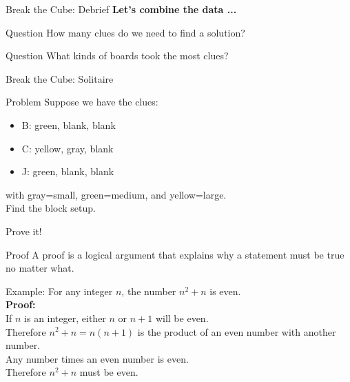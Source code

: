 \documentclass{beamer}
\begin{document}
\begin{frame}{Break the Cube: Debrief}
\pause
\textbf{Let's combine the data ...}
\pause
  \begin{block}{Question}
    How many clues do we need to find a solution?
  \end{block}
  \begin{block}{Question}
    What kinds of boards took the most clues?
  \end{block}
\end{frame}

\begin{frame}{Break the Cube: Solitaire}
  \begin{block}{Problem}
    Suppose we have the clues:
    \begin{itemize}
      \item B: green, blank, blank
      \item C: yellow, gray, blank
      \item J: green, blank, blank
    \end{itemize}
    with gray=small, green=medium, and yellow=large.\\
    Find the block setup.
  \end{block}
\end{frame}

\begin{frame}{Prove it!}
    \pause
  \begin{block}{Proof}
    A proof is a logical argument that explains why a statement must be true no matter what.
  \end{block}
    \pause
  \begin{block}{Example:}
    For any integer $n$, the number $n^2+n$ is even.\\
    \pause
    \textbf{Proof:}\\
    If $n$ is an integer, either $n$ or $n+1$ will be even.\\
    Therefore $n^2+n = n(n+1)$ is the product of an even number with another number.\\
    Any number times an even number is even.\\
    Therefore $n^2+n$ must be even.
  \end{block}
\end{frame}
\end{document}
